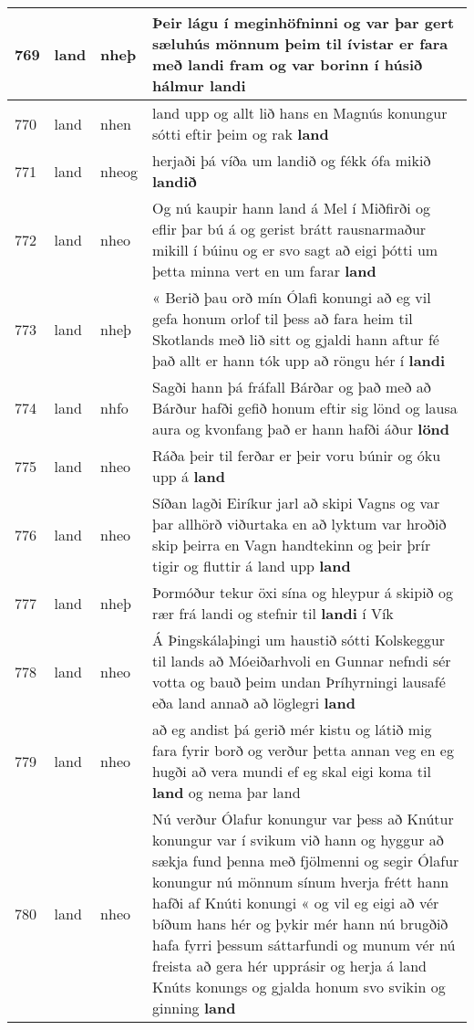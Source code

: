 \documentclass{article}
\begin{document}
\begin{longtable}{p{1cm}|p{1cm}|p{1cm}|p{13cm}}
\hline
769&land&nheþ&Þeir lágu í meginhöfninni og var þar gert sæluhús mönnum þeim til ívistar er fara með landi fram og var borinn í húsið hálmur \textbf{landi} \\
\hline
770&land&nhen&land upp og allt lið hans en Magnús konungur sótti eftir þeim og rak \textbf{land} \\
\hline
771&land&nheog&herjaði þá víða um landið og fékk ófa mikið \textbf{landið} \\
\hline
772&land&nheo&Og nú kaupir hann land á Mel í Miðfirði og eflir þar bú á og gerist brátt rausnarmaður mikill í búinu og er svo sagt að eigi þótti um þetta minna vert en um farar \textbf{land} \\
\hline
773&land&nheþ&« Berið þau orð mín Ólafi konungi að eg vil gefa honum orlof til þess að fara heim til Skotlands með lið sitt og gjaldi hann aftur fé það allt er hann tók upp að röngu hér í \textbf{landi} \\
\hline
774&land&nhfo&Sagði hann þá fráfall Bárðar og það með að Bárður hafði gefið honum eftir sig lönd og lausa aura og kvonfang það er hann hafði áður \textbf{lönd} \\
\hline
775&land&nheo&Ráða þeir til ferðar er þeir voru búnir og óku upp á \textbf{land} \\
\hline
776&land&nheo&Síðan lagði Eiríkur jarl að skipi Vagns og var þar allhörð viðurtaka en að lyktum var hroðið skip þeirra en Vagn handtekinn og þeir þrír tigir og fluttir á land upp \textbf{land} \\
\hline
777&land&nheþ&Þormóður tekur öxi sína og hleypur á skipið og rær frá landi og stefnir til \textbf{landi} í Vík\\
\hline
778&land&nheo&Á Þingskálaþingi um haustið sótti Kolskeggur til lands að Móeiðarhvoli en Gunnar nefndi sér votta og bauð þeim undan Þríhyrningi lausafé eða land annað að löglegri \textbf{land} \\
\hline
779&land&nheo&að eg andist þá gerið mér kistu og látið mig fara fyrir borð og verður þetta annan veg en eg hugði að vera mundi ef eg skal eigi koma til \textbf{land} og nema þar land\\
\hline
780&land&nheo&Nú verður Ólafur konungur var þess að Knútur konungur var í svikum við hann og hyggur að sækja fund þenna með fjölmenni og segir Ólafur konungur nú mönnum sínum hverja frétt hann hafði af Knúti konungi « og vil eg eigi að vér bíðum hans hér og þykir mér hann nú brugðið hafa fyrri þessum sáttarfundi og munum vér nú freista að gera hér upprásir og herja á land Knúts konungs og gjalda honum svo svikin og ginning \textbf{land} \\

\end{longtable}
\end{document}
